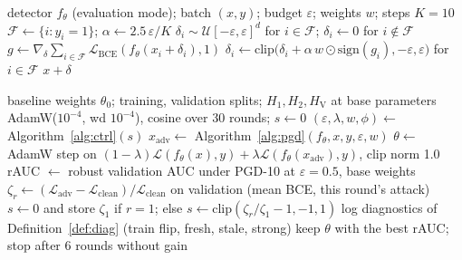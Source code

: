 \documentclass[conference]{IEEEtran}
\newcommand{\cL}{\mathcal{L}}
\newcommand{\HV}{H_{\mathrm{V}}}
\newcommand{\sig}{\mathrm{sign}}
\begin{document}
\begin{algorithm}[t]
\caption{In-loop attacker best response: weighted $L_\infty$ PGD on fraud rows}\label{alg:pgd}
\small
\begin{algorithmic}[1]
\Require detector $f_\theta$ (evaluation mode); batch $(x,y)$; budget $\varepsilon$; weights $w$; steps $K=10$
\State $\mathcal F\gets\{i:y_i=1\}$; $\alpha\gets2.5\,\varepsilon/K$
\State $\delta_i\sim\mathcal U[-\varepsilon,\varepsilon]^d$ for $i\in\mathcal F$; $\delta_i\gets0$ for $i\notin\mathcal F$
  \State $g\gets\nabla_\delta\sum_{i\in\mathcal F}\cL_{\mathrm{BCE}}(f_\theta(x_i+\delta_i),1)$ 
  \State $\delta_i\gets\mathrm{clip}\big(\delta_i+\alpha\,w\odot\sig(g_i),-\varepsilon,\varepsilon\big)$ for $i\in\mathcal F$ 
\EndFor
\State \Return $x+\delta$
\end{algorithmic}
\end{algorithm}

\begin{algorithm}[t]
\caption{HAD-Stack: Hamiltonian-controlled game loop}\label{alg:A}
\small
\begin{algorithmic}[1]
\Require baseline weights $\theta_0$; training, validation splits; $H_1,H_2,\HV$ at base parameters
\State AdamW($10^{-4}$, wd $10^{-4}$), cosine over 30 rounds; $s\gets0$
  \State $(\varepsilon,\lambda,w,\phi)\gets$ Algorithm~\ref{alg:ctrl}$(s)$ 
    \State $x_{\mathrm{adv}}\gets$ Algorithm~\ref{alg:pgd}$(f_\theta,x,y,\varepsilon,w)$ 
    \State $\theta\gets$ AdamW step on $(1{-}\lambda)\cL(f_\theta(x),y)+\lambda\cL(f_\theta(x_{\mathrm{adv}}),y)$, clip norm 1.0 
  \EndFor
  \State rAUC $\gets$ robust validation AUC under PGD-10 at $\varepsilon{=}0.5$, base weights
  \State $\zeta_r\gets(\cL_{\mathrm{adv}}-\cL_{\mathrm{clean}})/\cL_{\mathrm{clean}}$ on validation (mean BCE, this round's attack)
  \State $s\gets0$ and store $\zeta_1$ if $r=1$; else $s\gets\mathrm{clip}(\zeta_r/\zeta_1-1,-1,1)$ 
  \State log diagnostics of Definition~\ref{def:diag} (train flip, fresh, stale, strong)
  \State keep $\theta$ with the best rAUC; stop after 6 rounds without gain
\EndFor
\end{algorithmic}
\end{algorithm}
\end{document}
